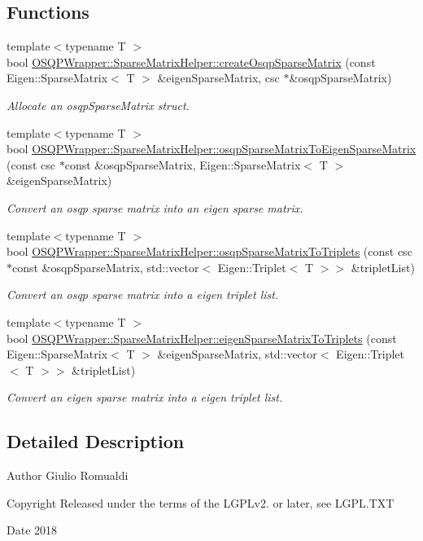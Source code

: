 \subsection*{Functions}
\begin{DoxyCompactItemize}
\item 
{\footnotesize template$<$typename T $>$ }\\bool \hyperlink{namespaceOSQPWrapper_1_1SparseMatrixHelper_aa363c7e41f52f1b871a432b334be1ae8}{O\+S\+Q\+P\+Wrapper\+::\+Sparse\+Matrix\+Helper\+::create\+Osqp\+Sparse\+Matrix} (const Eigen\+::\+Sparse\+Matrix$<$ T $>$ \&eigen\+Sparse\+Matrix, csc $\ast$\&osqp\+Sparse\+Matrix)
\begin{DoxyCompactList}\small\item\em Allocate an osqp\+Sparse\+Matrix struct. \end{DoxyCompactList}\item 
{\footnotesize template$<$typename T $>$ }\\bool \hyperlink{namespaceOSQPWrapper_1_1SparseMatrixHelper_a772dc23fcd9655a758c5a92091e8dafe}{O\+S\+Q\+P\+Wrapper\+::\+Sparse\+Matrix\+Helper\+::osqp\+Sparse\+Matrix\+To\+Eigen\+Sparse\+Matrix} (const csc $\ast$const \&osqp\+Sparse\+Matrix, Eigen\+::\+Sparse\+Matrix$<$ T $>$ \&eigen\+Sparse\+Matrix)
\begin{DoxyCompactList}\small\item\em Convert an osqp sparse matrix into an eigen sparse matrix. \end{DoxyCompactList}\item 
{\footnotesize template$<$typename T $>$ }\\bool \hyperlink{namespaceOSQPWrapper_1_1SparseMatrixHelper_a2661f2bc678993ad0016a1bd672b1988}{O\+S\+Q\+P\+Wrapper\+::\+Sparse\+Matrix\+Helper\+::osqp\+Sparse\+Matrix\+To\+Triplets} (const csc $\ast$const \&osqp\+Sparse\+Matrix, std\+::vector$<$ Eigen\+::\+Triplet$<$ T $>$$>$ \&triplet\+List)
\begin{DoxyCompactList}\small\item\em Convert an osqp sparse matrix into a eigen triplet list. \end{DoxyCompactList}\item 
{\footnotesize template$<$typename T $>$ }\\bool \hyperlink{namespaceOSQPWrapper_1_1SparseMatrixHelper_ac75b5cb3d1d29b29ff5e1eba588c5bfd}{O\+S\+Q\+P\+Wrapper\+::\+Sparse\+Matrix\+Helper\+::eigen\+Sparse\+Matrix\+To\+Triplets} (const Eigen\+::\+Sparse\+Matrix$<$ T $>$ \&eigen\+Sparse\+Matrix, std\+::vector$<$ Eigen\+::\+Triplet$<$ T $>$$>$ \&triplet\+List)
\begin{DoxyCompactList}\small\item\em Convert an eigen sparse matrix into a eigen triplet list. \end{DoxyCompactList}\end{DoxyCompactItemize}


\subsection{Detailed Description}
\begin{DoxyAuthor}{Author}
Giulio Romualdi 
\end{DoxyAuthor}
\begin{DoxyCopyright}{Copyright}
Released under the terms of the L\+G\+P\+Lv2. or later, see L\+G\+P\+L.\+T\+XT 
\end{DoxyCopyright}
\begin{DoxyDate}{Date}
2018 
\end{DoxyDate}
